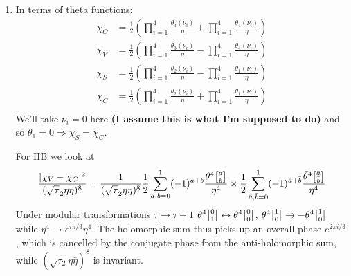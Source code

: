 \documentclass[11pt, class=article, crop=false]{standalone}
\begin{document}
\begin{enumerate}
	For the massive states in the type IIA and type IIB, we must tensor left- and right-moving states, and we wish to look at the lowest-level masses. Note we must match massive states with massive states. In this case, we match $2/\alpha$ on both sides to get massive states of mass $4/\alpha$. Since the particles already organize into representations of $\SO(9)$ on each side, the closed string massive spectrum will again clearly organize intro representations of $\SO(9)$. Also since fermionic and bosonic degrees of freedom already were equal on each side, they will be equal in the closed string as well. We will have $2 \times 128^2 = 32768$ bosonic and fermionic degrees of freedom. 

	
	\item In terms of theta functions:
	\[
	\begin{aligned}
		\chi_O &= \frac12 \left(\prod_{i=1}^4 \frac{\theta_3(\nu_i)}{\eta} + \prod_{i=1}^4 \frac{\theta_4(\nu_i)}{\eta} \right)\\
		\chi_V &= \frac12 \left(\prod_{i=1}^4 \frac{\theta_3(\nu_i)}{\eta} - \prod_{i=1}^4 \frac{\theta_4(\nu_i)}{\eta} \right)\\
		\chi_S &= \frac12 \left(\prod_{i=1}^4 \frac{\theta_2(\nu_i)}{\eta} - \prod_{i=1}^4 \frac{\theta_1(\nu_i)}{\eta} \right)\\
		\chi_C &= \frac12 \left(\prod_{i=1}^4 \frac{\theta_2(\nu_i)}{\eta} + \prod_{i=1}^4 \frac{\theta_1(\nu_i)}{\eta} \right)\\
	\end{aligned}
	\]
	We'll take $\nu_i = 0$ here \textbf{(I assume this is what I'm supposed to do)} and so $\theta_1 = 0 \Rightarrow \chi_S= \chi_C$.
	
	For IIB we look at 
	\[
		\frac{|\chi_V - \chi_C|^2}{(\sqrt \tau_2 \eta \bar \eta)^8} = \frac{1}{(\sqrt \tau_2 \eta \bar \eta)^8} \frac12 \sum_{a,b=0}^1 (-1)^{a+b} \frac{\theta^4\twist{a}{b} }{\eta^4}
		\times \frac12 \sum_{\bar a, \bar b=0}^1 (-1)^{\bar a + \bar b} \frac{\bar \theta^4 \twist{\bar a}{\bar b}}{\bar \eta^4}
	\]
	Under modular transformations $\tau \to \tau+1$ $\theta^4\twist01 \leftrightarrow \theta^4\twist00$, $\theta^4\twist10\to-\theta^4\twist10$ while $\eta^{4} \to e^{i\pi/3}\eta^{4}$. The holomorphic sum thus picks up an overall phase $e^{2\pi i/3}$, which is cancelled by the conjugate phase from the anti-holomorphic sum, while $(\sqrt{\tau_2}\eta \bar \eta)^8$ is invariant.
	

\end{enumerate}
\end{document}

